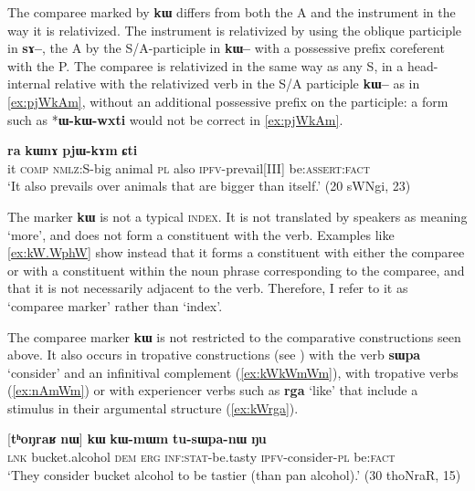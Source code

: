 \documentclass[oldfontcommands,oneside,a4paper,11pt]{article}
\newcommand{\ipa}[1]{{\phon\textbf{#1}}}
\begin{document}
The comparee marked by \ipa{kɯ} differs from both the A and the instrument in the way it is relativized. The instrument is relativized by using the oblique participle in \ipa{sɤ--}, the A by the S/A-participle in \ipa{kɯ--} with a possessive prefix coreferent with the P. The comparee is relativized in the same way as any S, in a head-internal relative with the relativized verb in the S/A participle  \ipa{kɯ--} as in \ref{ex:pjWkAm}, without an additional possessive prefix on the participle: a form such as *\ipa{ɯ-kɯ-wxti} would not be correct in \ref{ex:pjWkAm}.

 
 
\begin{exe}
\ex \label{ex:pjWkAm}
\gll
[\ipa{ɯʑo}  	\ipa{sɤz}  	\ipa{kɯ-wxti}]  	\ipa{rɯdaʁ}  	\ipa{ra}  	\ipa{kɯnɤ}  	\ipa{pjɯ-kɤm}  	\ipa{ɕti}  \\
it \textsc{comp} \textsc{nmlz}:S-big animal \textsc{pl} also \textsc{ipfv}-prevail[III] be:\textsc{assert}:\textsc{fact} \\
\glt `It also prevails over animals that are bigger than itself.' (20 sWNgi, 23)
  \end{exe}

 
The marker   \ipa{kɯ} is not a typical  \textsc{index}. It is not translated by speakers as meaning `more', and does not form a constituent with the verb. Examples like \ref{ex:kW.WphW} show instead that it forms a constituent with either the comparee or with a constituent within the noun phrase corresponding to the comparee, and that it is not necessarily adjacent to the verb. Therefore, I refer to it as `comparee marker' rather than  `index'.

  
The comparee marker \ipa{kɯ} is not restricted to the comparative constructions seen above. It also occurs in  tropative constructions (see \citealt{jacques13tropative}) with the verb \ipa{sɯpa} `consider' and an infinitival complement (\ref{ex:kWkWmWm}), with   tropative verbs (\ref{ex:nAmWm}) or with experiencer verbs such as \ipa{rga} `like' that include  a stimulus in their argumental structure (\ref{ex:kWrga}).

\begin{exe}
\ex \label{ex:kWkWmWm}
\gll  \ipa{tɕe}   [\ipa{tʰoŋraʁ}   	\ipa{nɯ}]   	\ipa{kɯ}   	\ipa{kɯ-mɯm}   	\ipa{tu-sɯpa-nɯ}   	\ipa{ŋu}   \\
\textsc{lnk} bucket.alcohol \textsc{dem} \textsc{erg} \textsc{inf:stat}-be.tasty \textsc{ipfv}-consider-\textsc{pl} be:\textsc{fact} \\
\glt `They consider  bucket alcohol to be tastier (than pan alcohol).' (30 thoNraR, 15)
\end{exe}
\end{document}
